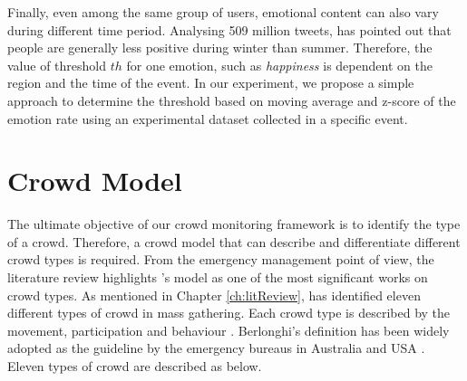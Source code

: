 Finally, even among the same group of users, emotional content can also vary during different time period. Analysing 509 million tweets, \citet{Golder30092011} has pointed out that people are generally less positive during winter than summer. Therefore, the value of threshold \(th\) for one emotion, such as \textit{happiness} is dependent on the region and the time of the event. In our experiment, we propose a simple approach to determine the threshold based on moving average and z-score of the emotion rate using an experimental dataset collected in a specific event.

\section{Crowd Model}

The ultimate objective of our crowd monitoring framework is to identify the type of a crowd. Therefore, a crowd model that can describe and differentiate different crowd types is required. From the emergency management point of view, the literature review highlights \citet{Berlonghi1995}'s model as one of the most significant works on crowd types. As mentioned in Chapter \ref{ch:litReview}, \citet{Berlonghi1995} has identified eleven different types of crowd in mass gathering. Each crowd type is described by the movement, participation and behaviour \citep{Zeitz2009}. Berlonghi's definition has been widely adopted as the guideline by the emergency bureaus in Australia \citep{EMA1999} and USA \citep{FEMA2005}. Eleven types of crowd are described as below.
